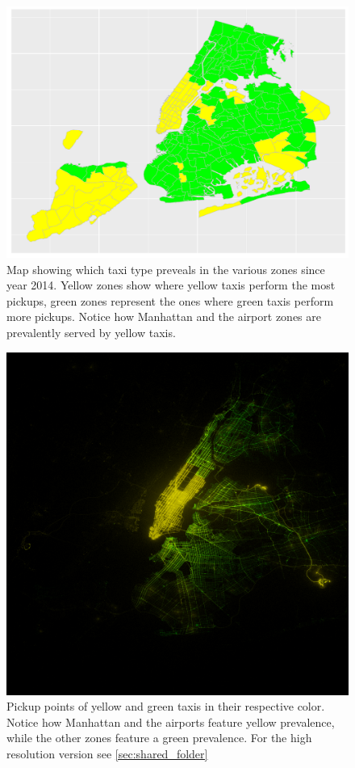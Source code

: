 \documentclass{acm_proc_article-sp-sigmod09}
\begin{document}
\begin{figure}
	\centering
	\includegraphics[width=1\columnwidth]{resources/base_plots/pickup_location_by_company_after_2014_distr_difference_map.pdf}
	\caption{Map showing which taxi type preveals in the various zones since year 2014. Yellow zones show where yellow taxis perform the most pickups, green zones represent the ones where green taxis perform more pickups. Notice how Manhattan and the airport zones are prevalently served by yellow taxis.}
	\label{fig:companyDivisionMap}
\end{figure}
\begin{figure}
	\centering
	\includegraphics[width=1\columnwidth]{resources/base_plots/yellow_vs_green_pickup.png}
	\caption{Pickup points of yellow and green taxis in their respective color. Notice how Manhattan and the airports feature yellow prevalence, while the other zones feature a green prevalence. For the high resolution version see \cref{sec:shared_folder}}
	\label{fig:companyDivisionImageMap}
\end{figure}
\end{document}

